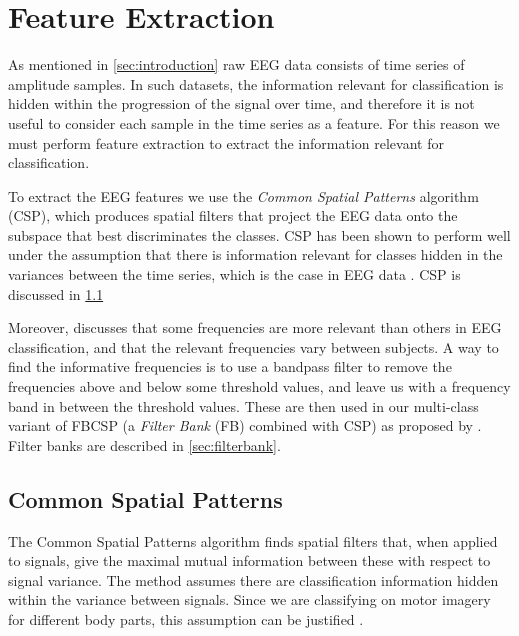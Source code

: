 \section{Feature Extraction}\label{sec:feature-extraction}
As mentioned in \cref{sec:introduction} raw EEG data consists of time series of amplitude samples. In such datasets, the information relevant for classification is hidden within the progression of the signal over time, and therefore it is not useful to consider each sample in the time series as a feature. For this reason we must perform feature extraction to extract the information relevant for classification. 

To extract the EEG features we use the \emph{Common Spatial Patterns} algorithm (CSP), which produces spatial filters that project the EEG data onto the subspace that best discriminates the classes.
CSP has been shown to perform well under the assumption that there is information relevant for classes hidden in the variances between the time series, which is the case in EEG data \cite{ang2012filter}. CSP is discussed in \cref{sec:csp}

Moreover, \cite{ang2012filter} discusses that some frequencies are more relevant than others in EEG classification, and that the relevant frequencies vary between subjects. A way to find the informative frequencies is to use a bandpass filter to remove the frequencies above and below some threshold values, and leave us with a frequency band in between the threshold values. These are then used in our multi-class variant of FBCSP (a \emph{Filter Bank} (FB) combined with CSP) as proposed by \citet{ang2012filter}. Filter banks are described in \cref{sec:filterbank}.

\subsection{Common Spatial Patterns}\label{sec:csp}
The Common Spatial Patterns algorithm finds spatial filters that, when applied to signals, give the maximal mutual information between these with respect to signal variance. The method assumes there are classification information hidden within the variance between signals. Since we are classifying on motor imagery for different body parts, this assumption can be justified \citep{blankertz2008optimizing}.

